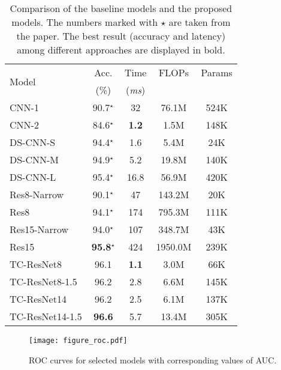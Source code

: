 \documentclass[a4paper]{article}
\begin{document}
\begin{table}[t]
    \begin{tabular}{lcccc}
        \toprule
        \multirow{2}{*}{Model} & Acc. & Time & FLOPs & Params \\
                              & (\%) & (\emph{ms})     &       & \\
        \midrule
        CNN-1                   & 90.7$^{\star}$ & 32  & 76.1M  & 524K \\
        CNN-2                   & 84.6$^{\star}$ & \textbf{1.2}  & 1.5M  & 148K \\
        DS-CNN-S                & 94.4$^{\star}$ & 1.6   & 5.4M  & 24K \\
        DS-CNN-M                & 94.9$^{\star}$ & 5.2   & 19.8M & 140K \\
        DS-CNN-L                & 95.4$^{\star}$ & 16.8  & 56.9M & 420K \\        
        Res8-Narrow             & 90.1$^{\star}$ & 47    & 143.2M  & 20K \\
        Res8                    & 94.1$^{\star}$ & 174   & 795.3M  & 111K \\
        Res15-Narrow            & 94.0$^{\star}$ & 107   & 348.7M  & 43K \\
        Res15                   & \textbf{95.8}$^{\star}$ & 424   & 1950.0M  & 239K \\
        \midrule
        TC-ResNet8                   & 96.1 & \textbf{1.1}   & 3.0M  & 66K \\
        TC-ResNet8-1.5               & 96.2 & 2.8   & 6.6M  & 145K \\
        TC-ResNet14                  & 96.2 & 2.5   & 6.1M  & 137K \\
        TC-ResNet14-1.5              & \textbf{96.6} & 5.7   & 13.4M & 305K \\
        \bottomrule
    \end{tabular}
    \caption{Comparison of the baseline models and the proposed models. 
    The numbers marked with $\star$ are taken from the paper.
    The best result (accuracy and latency) among different approaches are displayed in bold.
    }
    \vspace{-0.3cm}
    \label{tab:res}
\end{table}

\begin{figure}[t]
    \texttt{[image: figure\_roc.pdf]}
    \caption{ROC curves for selected models with corresponding values of AUC.}
    \vspace{-0.2cm}
    \label{fig:roc}
\end{figure}
\end{document}
